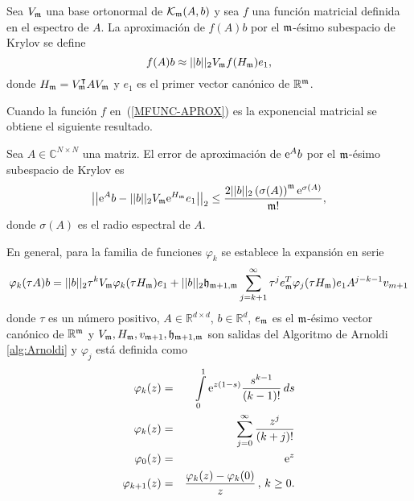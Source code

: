 \begin{definition}
    \cite{Saad92} Sea $V_{\mathfrak{m}}$ una base ortonormal de $\mathcal{K}_{\mathfrak{m}}(A,b)$ y sea $f$ una función matricial definida
    en el espectro de $A$. La aproximación de $f(A)b$ por el  $\mathfrak{m}$-ésimo subespacio de Krylov se define
    \begin{equation}
        f(A)b\approx ||b||_2 V_{\mathfrak{m}} f(H_{\mathfrak{m}})e_1, \label{MFUNC-APROX}
    \end{equation}
    donde $H_{\mathfrak{m}}=V_{\mathfrak{m}}^{\intercal}AV_{\mathfrak{m}}$ y $e_1$ es el primer vector canónico de $\mathbb{R}^{\mathfrak{m}}$.
\end{definition}
Cuando la función $f$ en~(\ref{MFUNC-APROX}) es la exponencial matricial se obtiene el siguiente resultado.
\begin{theorem}\label{exp-bound}
	\cite{Saad92} Sea $A\in\mathbb{C}^{N\times N}$ una matriz. El error de aproximación de $\mathrm{e}^{A}b$ por el $\mathfrak{m}$-ésimo subespacio
	de Krylov es
	\begin{equation*}
	\left\lvert\left\lvert \mathrm{e}^{A}b - \lvert\lvert b \rvert\rvert_2 V_{\mathfrak{m}}\mathrm{e}^{H_{\mathfrak{m}}}e_1 \right\rvert\right\rvert_2 
	\leq \frac{2\vert\lvert b \rvert\rvert_2 \left( \sigma(A) \right)^{\mathfrak{m}}\mathrm{e}^{\sigma(A)}}{\mathfrak{m}!},
	\end{equation*}
	donde $\sigma(A)$ es el radio espectral de $A$.
\end{theorem}
En general, para la familia de funciones $\varphi_k$ se establece la expansión en serie \cite{Saad92,sidje1998expokit}
\begin{equation}
\varphi_k(\tau A)b=||b||_2\tau^{k} V_{\mathfrak{m}} \varphi_k(\tau H_{\mathfrak{m}})e_1 + ||b||_2\mathfrak{h}_{\mathfrak{m}+1,\mathfrak{m}}
\sum_{j=k+1}^{\infty}\tau^{j} e_{\mathfrak{m}}^T\varphi_j(\tau H_{\mathfrak{m}})e_1A^{j-k-1}v_{m+1} \label{PHI-EXPANSION}
\end{equation}
donde $\tau$ es un número positivo, $A\in\mathbb{R}^{d\times d}$, $b\in\mathbb{R}^d$, $e_{\mathfrak{m}}$ es el $\mathfrak{m}$-ésimo vector canónico de $\mathbb{R}^{\mathfrak{m}}$ y $V_{\mathfrak{m}},H_{\mathfrak{m}},v_{\mathfrak{m}+1},\mathfrak{h}_{\mathfrak{m}+1,\mathfrak{m}}$ son salidas del Algoritmo de Arnoldi \ref{alg:Arnoldi} y $\varphi_j$ está definida como
\begin{eqnarray}\label{phi-definition}
    \varphi_k(z) & = &\int\limits_{0}^{1}\mathrm{e}^{z(1-s)}\frac{s^{k-1}}{(k-1)!}\,ds \nonumber \\
    \varphi_k(z) & = &\sum\limits_{j=0}^{\infty}\frac{z^{j}}{(k+j)!}\label{DEF-PHI}\\
    \varphi_0(z) &=& \mathrm{e}^{z} \nonumber\\
    \varphi_{k+1}(z) &=& \frac{\varphi_k(z)-\varphi_k(0)}{z}\,,\,k\geq0. \nonumber
\end{eqnarray}
